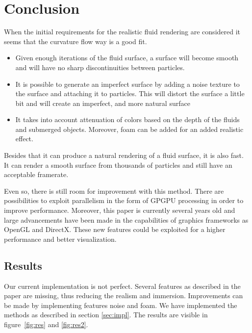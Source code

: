 
\section{Conclusion}
When the initial requirements for the realistic fluid rendering are considered it seems that the curvature flow way is a good fit.
\begin{itemize}
\item Given enough iterations of the fluid surface, a surface will become smooth and will have no sharp discontinuities between particles.
\item It is possible to generate an imperfect surface by adding a noise texture to the surface and attaching it to particles. This will distort the surface a little bit and will create an imperfect, and more natural surface
\item It takes into account attenuation of colors based on the depth of the fluids and submerged objects. Moreover, foam can be added for an added realistic effect.
\end{itemize}
Besides that it can produce a natural rendering of a fluid surface, it is also fast. 
It can render a smooth surface from thousands of particles and still have an acceptable framerate. 

Even so, there is still room for improvement with this method. There are possibilities to exploit parallelism in the form of GPGPU processing in order to improve performance.
Moreover, this paper is currently several years old and large advancements have been made in the capabilities of graphics frameworks as OpenGL and DirectX.
These new features could be exploited for a higher performance and better visualization.

\subsection{Results}
Our current implementation is not perfect.
Several features as described in the paper are missing, thus reducing the realism and immersion.
Improvements can be made by implementing features noise and foam.
We have implemented the methods as described in section \ref{sec:impl}.
The results are visible in figure~\ref{fig:res} and \ref{fig:res2}.

